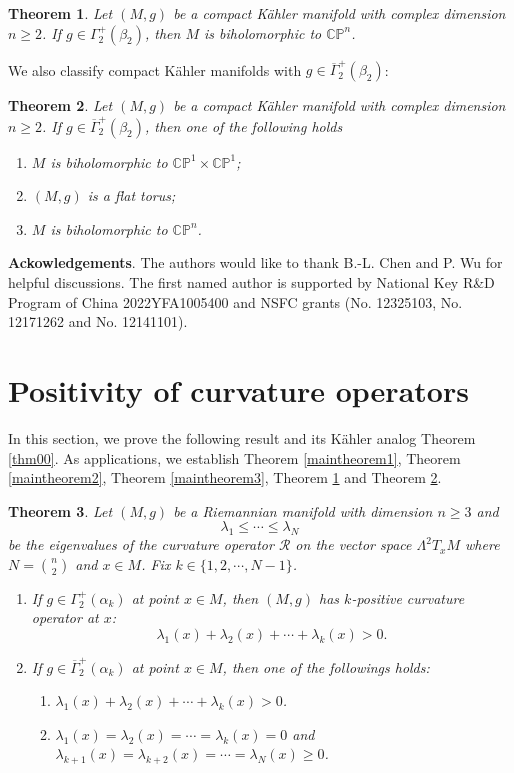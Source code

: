 \documentclass[12pt]{amsart}
\theoremstyle{plain}
\newtheorem{thm}{Theorem}[section]
\theoremstyle{definition}
\newcommand{\btheorem}{\begin{thm}}
\newcommand{\etheorem}{\end{thm}}
\renewcommand{\bar}{\overline}
\newcommand{\bd}{\begin{enumerate}}
\newcommand{\ed}{\end{enumerate}}
\renewcommand{\>}{\rightarrow}
\newcommand{\C}{{\mathbb C}}
\renewcommand{\P}{{\mathbb P}}
\numberwithin{equation}{section} %
\begin{document}
	\btheorem\label{main4} Let $(M,g)$ be a compact K\"ahler manifold with complex dimension $n\geq 2$. If $g\in \Gamma_2^+(\beta_2)$,  then $M$ is biholomorphic to $\C\P^n$.
	\etheorem
	
	\noindent We also classify compact K\"ahler manifolds with $g\in \bar \Gamma_2^+(\beta_2)$:
	
	
	\btheorem\label{maintheorem5}
Let $(M,g)$ be a compact K\"ahler manifold with complex dimension $n\geq 2$. If $g\in \bar \Gamma_2^+(\beta_2)$, then one of the following holds \bd
	\item  $M$ is biholomorphic to  $\C\P^1\times \C\P^1$;
	\item  $(M,g)$ is a flat torus;
	\item  $M$ is biholomorphic to $\C\P^n$.
	\ed
	\etheorem
	
	
	\baselineskip 
	
	\noindent \textbf{Ackowledgements}. The authors would like to thank B.-L. Chen and P. Wu for helpful discussions. The first named author is supported by National Key R\&D Program of China 2022YFA1005400 and NSFC grants  (No. 12325103, No. 12171262 and  No. 12141101).

\baselineskip


	\section{Positivity of curvature operators}
	
		In this section, we prove the following result and its K\"ahler analog Theorem \ref{thm00}. As applications, we establish Theorem \ref{maintheorem1}, Theorem \ref{maintheorem2}, Theorem \ref{maintheorem3}, Theorem \ref{main4} and Theorem \ref{maintheorem5}.
	\begin{thm}\label{thm0}
		Let $(M,g)$ be a Riemannian manifold with dimension $n\geq 3$ and
		$$\lambda_1\leq \cdots \leq \lambda_N$$  be the eigenvalues of the curvature operator $\mathscr R$ on the vector space $\Lambda^2T_xM$ where $N={n\choose 2}$ and $x\in M$. Fix $k\in\{1,2,\cdots, N-1\}$.
		\bd \item If $g\in\Gamma_2^+(\alpha_k)$ at point $x\in M$, then $(M,g)$ has $k$-positive curvature operator at $x$: $$\lambda_{1}(x)+\lambda_{2}(x)+\cdots+\lambda_k(x)>0.$$
		\item If $g\in \overline\Gamma_2^+(\alpha_k)$ at point $x\in M$, then one of the followings holds:
		\bd\item $\lambda_{1}(x)+\lambda_{2}(x)+\cdots+\lambda_k(x)>0$.
		\item	$\lambda_{1}(x)=\lambda_{2}(x)=\cdots=\lambda_k(x)=0$ and $\lambda_{k+1}(x)=\lambda_{k+2}(x)=\cdots=\lambda_{N}(x)\geq0$.
		\ed
		
		\ed
	\end{thm}
	
\end{document}
